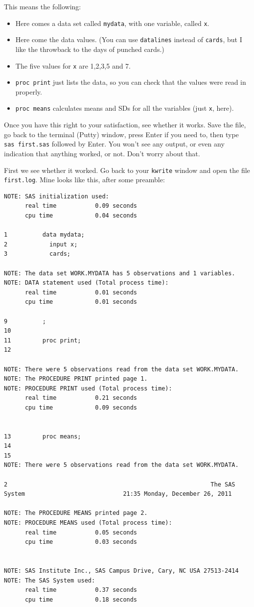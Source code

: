 \documentclass[11pt]{article}
\begin{document}
This means the following:

\begin{itemize}
\item Here comes a data set called \verb-mydata-, with one variable,
  called \verb-x-. 
\item Here come the data values. (You can use \verb-datalines- instead
  of \verb-cards-, but I like the throwback to the days of punched cards.)
\item The five values for \verb-x- are 1,2,3,5 and 7.
\item \verb-proc print- just lists the data, so you can check that the
  values were read in properly.
\item \verb-proc means- calculates means and SDs for all the variables
  (just \verb-x-, here).
\end{itemize}

Once you have this right to your satisfaction, see whether it
works. Save the file,
go back to the terminal (Putty) window, press Enter if you need to,
then type \texttt{sas first.sas} followed by Enter. You won't see any
output, or even 
any indication that anything worked, or not. Don't worry about that. 

First we see whether it worked. Go back to your \texttt{kwrite} window
and open the file \texttt{first.log}. Mine looks like this, after some
preamble: 

\filbreak
\begin{verbatim}
NOTE: SAS initialization used:
      real time           0.09 seconds
      cpu time            0.04 seconds
      
1          data mydata;
2            input x;
3            cards;

NOTE: The data set WORK.MYDATA has 5 observations and 1 variables.
NOTE: DATA statement used (Total process time):
      real time           0.01 seconds
      cpu time            0.01 seconds
      
9          ;
10         
11         proc print;
12         

NOTE: There were 5 observations read from the data set WORK.MYDATA.
NOTE: The PROCEDURE PRINT printed page 1.
NOTE: PROCEDURE PRINT used (Total process time):
      real time           0.21 seconds
      cpu time            0.09 seconds
      

13         proc means;
14         
15         
NOTE: There were 5 observations read from the data set WORK.MYDATA.

2                                                          The SAS System                            21:35 Monday, December 26, 2011

NOTE: The PROCEDURE MEANS printed page 2.
NOTE: PROCEDURE MEANS used (Total process time):
      real time           0.05 seconds
      cpu time            0.03 seconds
      

NOTE: SAS Institute Inc., SAS Campus Drive, Cary, NC USA 27513-2414
NOTE: The SAS System used:
      real time           0.37 seconds
      cpu time            0.18 seconds

\end{verbatim}
\end{document}
